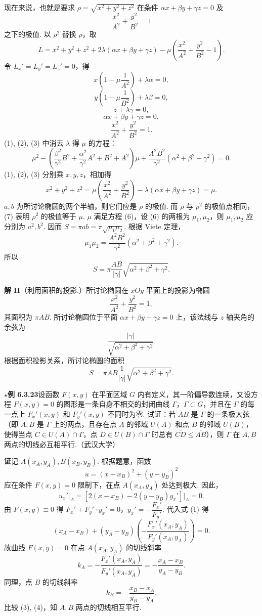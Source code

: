 \documentclass[UTF8, 12pt, fontset=fandol, oneside]{ctexart}
\begin{document}
现在来说，也就是要求 $\rho=\sqrt{x^2+y^2+z^2}$ 在条件 $\alpha x+\beta y+\gamma z=0$ 及
\[
  \frac{x^2}{A^2}+\frac{y^2}{B^2}=1
\]
之下的极值. 以 $\rho^2$ 替换 $\rho$，取
\[
  L=x^2+y^2+z^2+2\lambda(\alpha x+\beta y+\gamma z)
  -\mu\left(\frac{x^2}{A^2}+\frac{y^2}{B^2}-1\right).
\]
令 $L_x'=L_y'=L_z'=0$，得
\[
  x\left(1-\mu\frac1{A^2}\right)+\lambda\alpha=0, \tag{1}
\]
\[
  y\left(1-\mu\frac1{B^2}\right)+\lambda\beta=0, \tag{2}
\]
\[
  z+\lambda\gamma=0, \tag{3}
\]
\[
  \alpha x+\beta y+\gamma z=0, \tag{4}
\]
\[
  \frac{x^2}{A^2}+\frac{y^2}{B^2}=1. \tag{5}
\]
(1), (2), (3) 中消去 $\lambda$ 得 $\mu$ 的方程：
\[
  \mu^2-\left(\frac{\beta^2}{\gamma^2}B^2+
  \frac{\alpha^2}{\gamma^2}A^2+B^2+A^2\right)\mu
  +\frac{A^2B^2}{\gamma^2}(\alpha^2+\beta^2+\gamma^2)=0. \tag{6}
\]
(1), (2), (3) 分别乘 $x,y,z$，相加得
\[
  x^2+y^2+z^2=\mu\left(\frac{x^2}{A^2}+\frac{y^2}{B^2}\right)
  -\lambda(\alpha x+\beta y+\gamma z)=\mu. \tag{7}
\]
$a,b$ 为所讨论椭圆的两个半轴，则它们应是 $\rho$ 的极值. 而 $\rho$ 与 $\rho^2$ 的极值点相同，(7) 表明 $\rho^2$ 的极值等于 $\mu$. $\mu$ 满足方程 (6)，设 (6) 的两根为 $\mu_1,\mu_2$，则 $\mu_1,\mu_2$ 应分别为 $a^2,b^2$. 因而 $S=\pi ab=\pi\sqrt{\mu_1\mu_2}$. 根据 Viete 定理，
\[
  \mu_1\mu_2=\frac{A^2B^2}{\gamma^2}(\alpha^2+\beta^2+\gamma^2).
\]
所以
\[
  S=\pi\frac{AB}{|\gamma|}\sqrt{\alpha^2+\beta^2+\gamma^2}.
\]

\noindent\textbf{解 II}\quad （利用面积的投影.）所讨论椭圆在 $xOy$ 平面上的投影为椭圆
\[
  \frac{x^2}{A^2}+\frac{y^2}{B^2}=1,
\]
其面积为 $\pi AB$. 所讨论椭圆位于平面 $\alpha x+\beta y+\gamma z=0$ 上，该法线与 $z$ 轴夹角的余弦为
\[
  \frac{|\gamma|}{\sqrt{\alpha^2+\beta^2+\gamma^2}}.
\]
根据面积投影关系，所讨论椭圆的面积
\[
  S=\pi AB\frac1{|\gamma|}\sqrt{\alpha^2+\beta^2+\gamma^2}.
\]

\noindent\textbf{\ensuremath{\star}例 6.3.23}\quad 设函数 $F(x,y)$ 在平面区域 $G$ 内有定义，其一阶偏导数连续，又设方程 $F(x,y)=0$ 的图形是一条自身不相交的封闭曲线 $\Gamma$，$\Gamma\subset G$，并且在 $\Gamma$ 的每一点上 $F_x'(x,y)$ 和 $F_y'(x,y)$ 不同时为零. 试证：若 $AB$ 是 $\Gamma$ 的一条极大弦（即 $A,B$ 是 $\Gamma$ 上的两点，且存在点 $A$ 的邻域 $U(A)$ 和点 $B$ 的邻域 $U(B)$，使得当点 $C\in U(A)\cap\Gamma$，点 $D\in U(B)\cap\Gamma$ 时总有 $\overline{CD}\le\overline{AB}$），则 $\Gamma$ 在 $A,B$ 两点的切线必互相平行.（武汉大学）

\noindent\textbf{证}\quad 记 $A(x_A,y_A),B(x_B,y_B)$. 根据题意，函数
\[
  u=(x-x_B)^2+(y-y_B)^2
\]
应在条件 $F(x,y)=0$ 限制下，在点 $A(x_A,y_A)$ 处达到极大. 因此，
\[
  u_x'\big|_A=\left[2(x-x_B)-2(y-y_B)y_x'\right]\big|_A=0. \tag{1}
\]
由 $F(x,y)\equiv0$ 得 $F_x'+F_y'\cdot y_x'=0$，$y_x'=-\dfrac{F_x'}{F_y'}$. 代入式 (1) 得
\[
  (x_A-x_B)+(y_A-y_B)\left(-\frac{F_x'(x_A,y_A)}{F_y'(x_A,y_A)}\right)=0. \tag{2}
\]
故曲线 $F(x,y)=0$ 在点 $A(x_A,y_A)$ 的切线斜率
\[
  k_A=-\frac{F_x'(x_A,y_A)}{F_y'(x_A,y_A)}
  =-\frac{x_A-x_B}{y_A-y_B}. \tag{3}
\]
同理，点 $B$ 的切线斜率
\[
  k_B=-\frac{x_B-x_A}{y_B-y_A}. \tag{4}
\]
比较 (3), (4)，知 $A,B$ 两点的切线相互平行.
\end{document}
